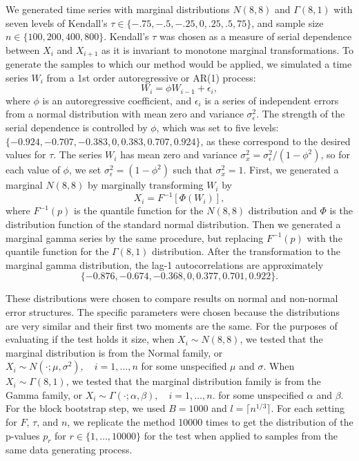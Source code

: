 \documentclass[12pt]{article}
\begin{document}
We generated time series with marginal distributions $N(8, 8)$ and
$\Gamma(8, 1)$ with seven levels of Kendall's
$\tau \in \{-.75, -.5, -.25, 0, .25, .5, 75\}$, and
sample size $n \in \{100, 200, 400, 800\}$. Kendall's $\tau$ was chosen as a
measure of serial dependence between $X_i$ and
$X_{i+1}$ as it is invariant to monotone marginal
transformations.
To generate the samples to which our
method would be applied, we simulated a time series $W_i$ from a 1st
order autoregressive or AR(1) process:
\begin{equation*}
W_i = \phi W_{i-1} + \epsilon_i,
\end{equation*}
where $\phi$ is an autoregressive coefficient, and $\epsilon_i$ is a series of
independent errors from a normal distribution with mean zero and variance
$\sigma_{\epsilon}^2$. The strength of the serial dependence is controlled by
$\phi$, which was set to five levels:
$\{-0.924, -0.707, -0.383, 0, 0.383, 0.707, 0.924\}$, as these
correspond to the desired values for $\tau$. The
series $W_i$ has mean zero and variance
$\sigma_x^2 = \sigma_{\epsilon}^2 / (1 - \phi^2)$, so for each value of
$\phi$,  we
set $\sigma_{\epsilon}^2 = (1 - \phi^2)$ such that $\sigma_x^2 = 1$.
First, we generated a
marginal $N(8, 8)$ by marginally transforming $W_i$ by
\begin{equation*}
X_i = F^{-1}[\Phi(W_i)],
\end{equation*}
where $F^{-1}(p)$ is the quantile function for the $N(8, 8)$
distribution and $\Phi$ is the distribution function of the standard normal
distribution.
Then we generated a marginal gamma series by the same procedure, but
replacing $F^{-1}(p)$ with the quantile function for the $\Gamma(8, 1)$
distribution.
After the transformation
to the marginal gamma distribution, the lag-1 autocorrelations are approximately
\[
  \{-0.876, -0.674, -0.368, 0, 0.377, 0.701, 0.922\}.
\]


These distributions
were chosen to compare results on normal and non-normal
error structures. The specific parameters were chosen because the distributions
are very similar and their
first two moments are the same.
For the purposes of
evaluating if the test holds it size, when $X_i \sim N(8, 8)$, we tested that the
marginal distribution is from the
Normal family, or
$X_i \sim N(\cdot ; \mu, \sigma^2), \quad i = 1, \ldots, n$
for some unspecified $\mu$ and $\sigma$. When $X_i \sim \Gamma(8, 1)$, we tested
that the marginal distribution family is from the Gamma family,
or
$X_i \sim \Gamma(\cdot ; \alpha, \beta), \quad i = 1, \ldots, n$.
for some unspecified $\alpha$ and $\beta$. For the block bootstrap step,
we used $B = 1000$ and $l = \lceil n^{1/3} \rceil$.
For each setting for $F$, $\tau$, and $n$, we replicate the method 10000 times
to get the distribution of the p-values $p_r$ for
$r \in \{1, \dots, 10000\}$
for the test when applied to samples from the same data generating process.
\end{document}
